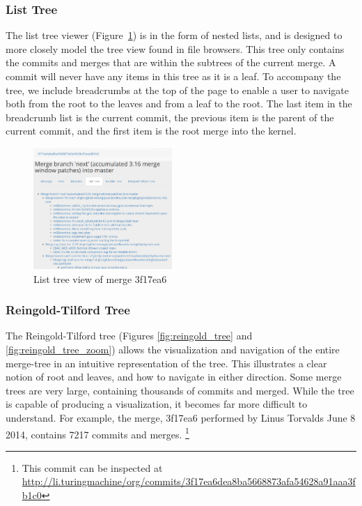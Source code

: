 \documentclass[draft]{IEEEtran}
\begin{document}
\subsubsection{List Tree}

The list tree viewer (Figure~\ref{fig:list_tree}) is in the form of
nested lists, and is designed to more closely model the tree view found
in file browsers. This tree only contains the commits and merges that
are within the subtrees of the current merge. A commit will never have
any items in this tree as it is a leaf. To accompany the tree, we
include breadcrumbs at the top of the page to enable a user to navigate
both from the root to the leaves and from a leaf to the root. The last
item in the breadcrumb list is the current commit, the previous item is
the parent of the current commit, and the first item is the root merge
into the kernel.

\begin{figure}
        \centering
        \includegraphics[width=0.47\textwidth]{figures/list_tree.png}
        \caption{List tree view of merge 3f17ea6}
        \label{fig:list_tree}
\end{figure}

\subsubsection{Reingold-Tilford Tree}

The Reingold-Tilford tree\cite{Reingold1981} (Figures
\ref{fig:reingold_tree} and \ref{fig:reingold_tree_zoom}) allows the
visualization and navigation of the entire merge-tree in an intuitive
representation of the tree.  This illustrates a clear notion of root and
leaves, and how to navigate in either direction. Some merge trees are
very large, containing thousands of commits and merged. While the tree
is capable of producing a visualization, it becomes far more difficult
to understand. For example, the merge, 3f17ea6 performed by Linus
Torvalds June 8 2014, contains 7217 commits and merges. \footnote{This
  commit can be inspected at
  \url{http://li.turingmachine/org/commits/3f17ea6dea8ba5668873afa54628a91aaa3fb1c0}}
\end{document}
